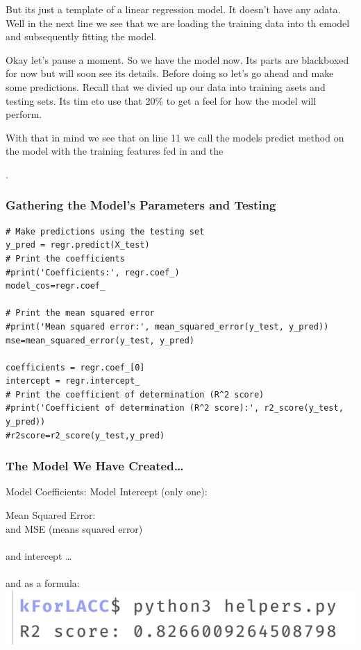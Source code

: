 \documentclass{beamer}
\newcounter{slidenum}
\begin{document}
\begin{frame}[fragile]
{{	But its just a template of a linear regression model. It doesn't have any adata. 
	Well in the next line we see that we are loading the training data into th emodel and
	subsequently fitting the model. 

	Okay let's pause a moment. So we have the model now. Its parts are blackboxed for now but
	will soon see its details. 
	Before doing so let's go ahead and make some predictions. 
Recall that we divied up our data into training asets and testing sets. Its tim eto use that 20\% to
get a feel for how the model will perform. 

With that in mind we see that on line 11 we call the models predict method on the model with the
training features fed in and the 

}}.

\end{frame}

\begin{frame}[fragile]
	\frametitle{Gathering the Model's Parameters and Testing}
	\begin{lstlisting}[firstnumber=12]
# Make predictions using the testing set
y_pred = regr.predict(X_test)
# Print the coefficients
#print('Coefficients:', regr.coef_)
model_cos=regr.coef_

# Print the mean squared error
#print('Mean squared error:', mean_squared_error(y_test, y_pred))
mse=mean_squared_error(y_test, y_pred)

coefficients = regr.coef_[0]
intercept = regr.intercept_
# Print the coefficient of determination (R^2 score)
#print('Coefficient of determination (R^2 score):', r2_score(y_test, y_pred))
#r2score=r2_score(y_test,y_pred)
	\end{lstlisting}
\end{frame}

\begin{frame}[fragile]
	\frametitle{The Model We Have Created\ldots}
Model Coefficients:
Model Intercept (only one):

Mean Squared Error: 
	\\
	and MSE (means squared error)\\\
	\\
	and intercept \ldots\\
	\\
	and as a formula:\\
	\includegraphics[width=\textwidth]{r2.png}
\end{frame}
\end{document}
